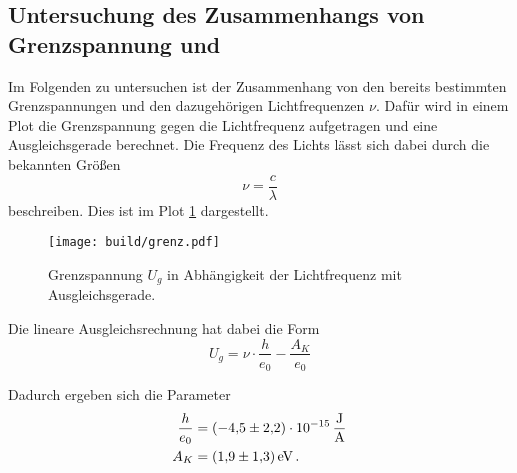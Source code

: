 \subsection{Untersuchung des Zusammenhangs von Grenzspannung und }

Im Folgenden zu untersuchen ist der Zusammenhang von den bereits bestimmten Grenzspannungen und den dazugehörigen Lichtfrequenzen $\nu$.
Dafür wird in einem Plot die Grenzspannung gegen die Lichtfrequenz aufgetragen und eine Ausgleichsgerade berechnet. Die Frequenz des Lichts
lässt sich dabei durch die bekannten Größen
\begin{equation}
    \nu = \frac{c}{\lambda}
\end{equation}
beschreiben.
Dies ist im Plot \ref{fig:rip} dargestellt.
\begin{figure}
    \centering
    \texttt{[image: build/grenz.pdf]}
    \caption{Grenzspannung $U_g$ in Abhängigkeit der Lichtfrequenz mit Ausgleichsgerade.}
    \label{fig:rip}
\end{figure}
\FloatBarrier

Die lineare Ausgleichsrechnung hat dabei die Form 
\begin{equation}
    U_g = \nu\cdot \frac{h}{e_0} - \frac{A_K}{e_0}
\end{equation}

Dadurch ergeben sich die Parameter 
\begin{align*}
    \frac{h}{e_0} &= \SI{-4.5(22)e-15}{\frac{\joule}{\ampere}} \\
    A_K           &= \SI{1.9(13)}{\electronvolt}\,.
\end{align*}
